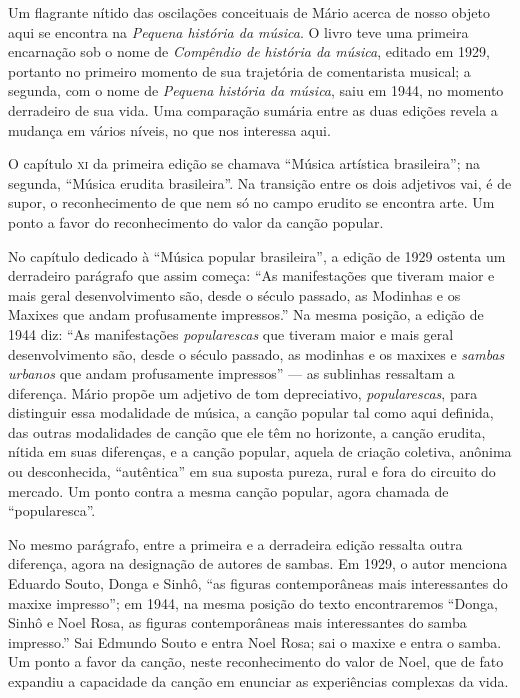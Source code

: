 Um flagrante nítido das oscilações conceituais de Mário acerca de nosso
objeto aqui se encontra na \textit{Pequena história da música}. O livro
teve uma primeira encarnação sob o nome de \textit{Compêndio de história
da música}, editado em 1929, portanto no primeiro momento de sua
trajetória de comentarista musical; a segunda, com o nome de
\textit{Pequena história da música}, saiu em 1944, no momento derradeiro
de sua vida. Uma comparação sumária entre as duas edições revela a
mudança em vários níveis, no que nos interessa aqui.

O capítulo \textsc{xi} da primeira edição se chamava ``Música artística
brasileira''; na segunda, ``Música erudita brasileira''. Na transição
entre os dois adjetivos vai, é de supor, o reconhecimento de que nem só
no campo erudito se encontra arte. Um ponto a favor do reconhecimento do
valor da canção popular.

No capítulo dedicado à ``Música popular brasileira'', a edição de
1929 ostenta um derradeiro parágrafo que assim começa: ``As
manifestações que
tiveram maior e mais geral desenvolvimento são, desde o século passado,
as Modinhas e os Maxixes que andam profusamente impressos.'' Na mesma
posição, a edição de 1944 diz: ``As manifestações \textit{popularescas} que
tiveram maior e mais geral desenvolvimento são, desde o século passado,
as modinhas e os maxixes e \textit{sambas urbanos} que andam profusamente
impressos'' --- as sublinhas ressaltam a diferença. Mário propõe um
adjetivo de tom depreciativo, \textit{popularescas}, para distinguir essa
modalidade de música, a canção popular tal como aqui definida, das
outras modalidades de canção que ele têm no horizonte, a canção erudita,
nítida em suas diferenças, e a canção popular, aquela de criação
coletiva, anônima ou desconhecida, ``autêntica'' em sua suposta pureza,
rural e fora do circuito do mercado. Um ponto contra a mesma canção
popular, agora chamada de ``popularesca''.

No mesmo parágrafo, entre a primeira e a derradeira edição ressalta
outra diferença, agora na designação de autores de sambas. Em 1929, o
autor menciona Eduardo Souto, Donga e Sinhô, ``as figuras contemporâneas
mais interessantes do maxixe impresso''; em 1944, na mesma posição do
texto encontraremos ``Donga, Sinhô e Noel Rosa, as figuras
contemporâneas mais interessantes do samba impresso.'' Sai Edmundo Souto
e entra Noel Rosa; sai o maxixe e entra o samba. Um ponto a favor da
canção, neste reconhecimento do valor de Noel, que de fato expandiu a
capacidade da canção em enunciar as experiências complexas da vida.

